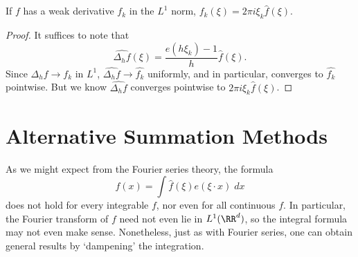 \begin{theorem}
    If $f$ has a weak derivative $f_k$ in the $L^1$ norm, $\widehat{f_k}(\xi) = 2 \pi i \xi_k \widehat{f}(\xi)$.
\end{theorem}
\begin{proof}
    It suffices to note that
    \[ \widehat{\Delta_h f}(\xi) = \frac{e(h \xi_k) - 1}{h} \widehat{f}(\xi). \]
    Since $\Delta_h f \to f_k$ in $L^1$, $\widehat{\Delta_h f} \to \widehat{f_k}$ uniformly, and in particular, converges to $\widehat{f_k}$ pointwise. But we know $\widehat{\Delta_h f}$ converges pointwise to $2 \pi i \xi_k \widehat{f}(\xi)$.
\end{proof}

%

\section{Alternative Summation Methods}

As we might expect from the Fourier series theory, the formula
%
\[ f(x) = \int \widehat{f}(\xi) e(\xi \cdot x)\; dx \]
%
does not hold for every integrable $f$, nor even for all continuous $f$. In particular, the Fourier transform of $f$ need not even lie in $L^1(\RR^d)$, so the integral formula may not even make sense. Nonetheless, just as with Fourier series, one can obtain general results by `dampening' the integration.

